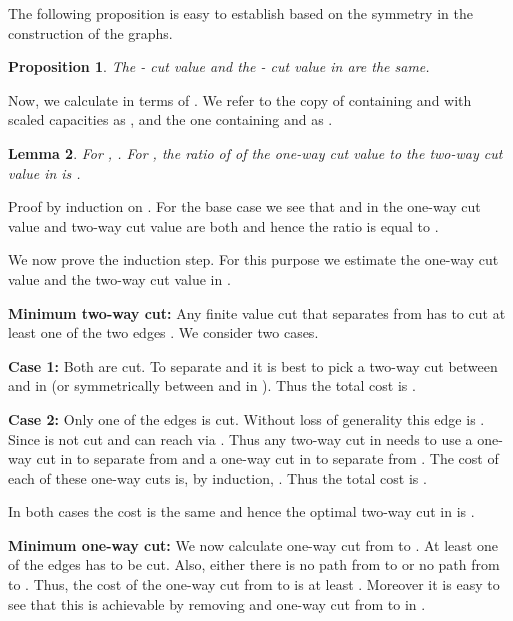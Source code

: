 \documentclass[11pt]{article}
\newtheorem{lemma}{Lemma}[section]
\newtheorem{prop}[lemma]{Proposition}
\renewenvironment{proof}{\vspace{-0.1in}\noindent{\bf Proof:}}{\hspace*{\fill}\par}
\begin{document}
The following proposition is easy to establish based on the symmetry in
the construction of the graphs.
\begin{prop}
  The - cut value and the - cut value in  are the same.
\end{prop}

Now, we calculate  in terms of . We refer to the
copy of  containing  and  with scaled capacities as , and the one 
containing  and  as .

\begin{lemma}
  For , . 
  For , the ratio of of
  the one-way cut value to the two-way cut value in  is
  .
\end{lemma}
\begin{proof}
  Proof by induction on . For the base case we see that  and in  the one-way cut value and two-way cut value are both
   and hence the ratio is equal to .
  
  We now prove the induction step. For this purpose we estimate the
  one-way cut value and the two-way cut value in .

  \noindent
  \textbf{Minimum two-way cut:} Any finite value cut that separates
   from  has to cut at least one of the two edges .
  We consider two cases.
  
  \noindent\textbf{Case 1:} Both  are cut. 
  To separate  and  it is best to pick a two-way cut between 
  and  in  (or symmetrically between  and  in ).
  Thus the total cost is .
  
  \noindent\textbf{Case 2:} Only one of the edges   is cut.
  Without loss of generality this edge is . Since 
  is not cut  and  can reach  via . Thus any two-way cut
  in  needs to use a one-way cut in  to separate  from 
  and a one-way cut in  to separate  from . The cost of each
  of these one-way cuts is, by induction, . Thus the total
  cost is .

  In both cases the cost is the same and hence the optimal two-way cut in
   is .
  
 
  \noindent\textbf{Minimum one-way cut:} We now calculate one-way cut
  from  to . At least one of the edges  has to
  be cut. Also, either there is no path from  to  or no path from  to
  . Thus, the cost of the one-way cut from  to  is at least . Moreover it
  is easy to see that this is achievable by removing  and
  one-way cut from  to  in .


\end{proof}
\end{document}
